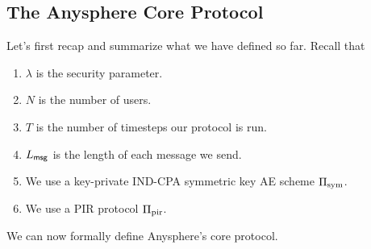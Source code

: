 \subsection{The Anysphere Core Protocol}
Let's first recap and summarize what we have defined so far. Recall that
\begin{enumerate}
    \item $\lambda$ is the security parameter.
    \item $N$ is the number of users.
    \item $T$ is the number of timesteps our protocol is run.
    \item $L_{\mathsf{msg}}$ is the length of each message we send.
    \item We use a key-private IND-CPA symmetric key AE scheme $\Pi_{\text{sym}}$.
    \item We use a PIR protocol $\Pi_{\text{pir}}$.
\end{enumerate}
We can now formally define Anysphere's core protocol.
